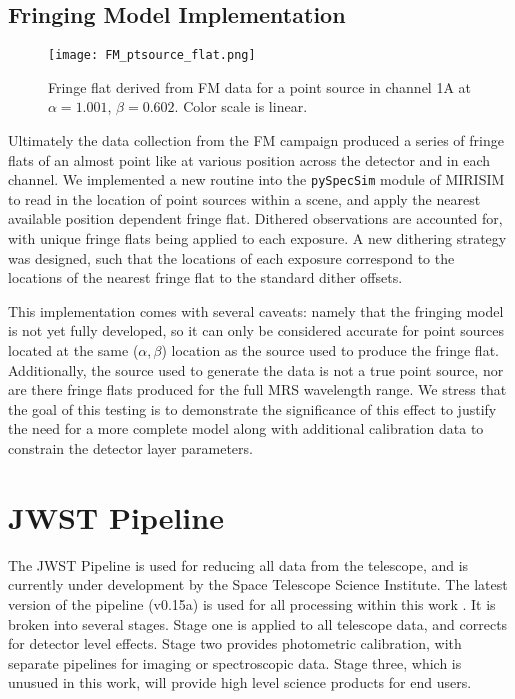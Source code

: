 \subsection{Fringing Model Implementation}
\begin{wrapfigure}{r}{5.5cm}
	\vspace{-1em}
	\texttt{[image: FM\_ptsource\_flat.png]}
	\caption{Fringe flat derived from FM data for a point source in channel 1A at $\alpha=1.001$, $\beta=0.602$. Color scale is linear.}
	\label{fig:ptsrcfringeflat}
\end{wrapfigure}
Ultimately the data collection from the FM campaign produced a series of fringe flats of an almost point like at various position across the detector and in each channel.
We implemented a new routine into the \verb|pySpecSim| module of MIRISIM to read in the location of point sources within a scene, and apply the nearest available position dependent fringe flat. 
Dithered observations are accounted for, with unique fringe flats being applied to each exposure.
A new dithering strategy was designed, such that the locations of each exposure correspond to the locations of the nearest fringe flat to the standard dither offsets.

This implementation comes with several caveats: namely that the fringing model is not yet fully developed, so it can only be considered accurate for point sources located at the same ($\alpha,\beta$) location as the source used to produce the fringe flat. Additionally, the source used to generate the data is not a true point source, nor are there fringe flats produced for the full MRS wavelength range.
We stress that the goal of this testing is to demonstrate the significance of this effect to justify the need for a more complete model along with additional calibration data to constrain the detector layer parameters.

\section{JWST Pipeline}
The JWST Pipeline is used for reducing all data from the telescope, and is currently under development by the Space Telescope Science Institute. The latest version of the pipeline (v0.15a) is used for all processing within this work \parencite{Bushouse2015}.
It is broken into several stages. 
Stage one is applied to all telescope data, and corrects for detector level effects.
Stage two provides photometric calibration, with separate pipelines for imaging or spectroscopic data.
Stage three, which is unusued in this work, will provide high level science products for end users.%
